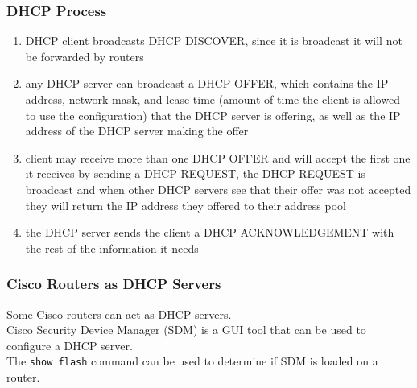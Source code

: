 \subsubsection{DHCP Process}

\begin{enumerate}

\item DHCP client broadcasts DHCP DISCOVER, since it is broadcast it will not
be forwarded by routers

\item any DHCP server can broadcast a DHCP OFFER, which contains the IP
address, network mask, and lease time (amount of time the client is allowed to
use the configuration) that the DHCP server is offering, as well as the IP
address of the DHCP server making the offer

\item client may receive more than one DHCP OFFER and will accept the first
one it receives by sending a DHCP REQUEST, the DHCP REQUEST is broadcast and
when other DHCP servers see that their offer was not accepted they will
return the IP address they offered to their address pool

\item the DHCP server sends the client a DHCP ACKNOWLEDGEMENT with the rest of
the information it needs

\end{enumerate}

\subsubsection{Cisco Routers as DHCP Servers}

Some Cisco routers can act as DHCP servers.\\

Cisco Security Device Manager (SDM) is a GUI tool that can be used to
configure a DHCP server.\\

The \texttt{show flash} command can be used to determine if SDM is loaded on
a router.



